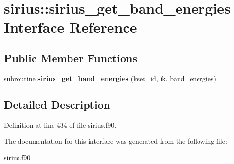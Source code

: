 \hypertarget{interfacesirius_1_1sirius__get__band__energies}{}\section{sirius\+:\+:sirius\+\_\+get\+\_\+band\+\_\+energies Interface Reference}
\label{interfacesirius_1_1sirius__get__band__energies}
\subsection*{Public Member Functions}
\begin{DoxyCompactItemize}
\item 
\hypertarget{interfacesirius_1_1sirius__get__band__energies_a5547cf3fa9bdadfa543e8390559a90b7}{}subroutine {\bfseries sirius\+\_\+get\+\_\+band\+\_\+energies} (kset\+\_\+id, ik, band\+\_\+energies)\label{interfacesirius_1_1sirius__get__band__energies_a5547cf3fa9bdadfa543e8390559a90b7}

\end{DoxyCompactItemize}


\subsection{Detailed Description}


Definition at line 434 of file sirius.\+f90.



The documentation for this interface was generated from the following file\+:\begin{DoxyCompactItemize}
\item 
sirius.\+f90\end{DoxyCompactItemize}
